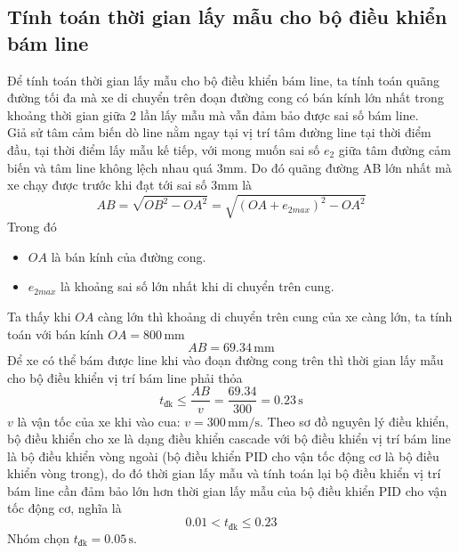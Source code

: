           \subsection{Tính toán thời gian lấy mẫu cho bộ điều khiển bám line}
               \hspace*{0.6cm}Để tính toán thời gian lấy mẫu cho bộ điều khiển bám line, ta tính toán quãng đường tối đa mà xe di chuyển trên đoạn đường cong 
               có bán kính lớn nhất trong khoảng thời gian giữa 2 lần lấy mẫu mà vẫn đảm bảo được sai số bám line.\\
               \hspace*{0.6cm}Giả sử tâm cảm biến dò line nằm ngay tại vị trí tâm đường line tại thời điểm đầu, tại thời điểm lấy mẫu kế tiếp, với mong muốn sai số $e_2$ giữa tâm đường cảm biến 
               và tâm line không lệch nhau quá 3mm. Do đó quãng đường AB lớn nhất mà xe chạy được trước khi đạt tới sai số 3mm là 
               \begin{equation*}
                    AB = \sqrt{OB^2 - OA^2} = \sqrt{(OA + e_{2max})^2 - OA^2}
               \end{equation*}
               Trong đó 
               \begin{itemize}
                    \item $OA$ là bán kính của đường cong.
                    \item $e_{2max}$ là khoảng sai số lớn nhất khi di chuyển trên cung.
               \end{itemize}
               Ta thấy khi $OA$ càng lớn thì khoảng di chuyển trên cung của xe càng lớn, ta tính toán với bán kính $OA = 800 \,\mathrm{mm}$
               \begin{equation*}
                    AB = 69.34 \,\mathrm{mm}
               \end{equation*}
               Để xe có thể bám được line khi vào đoạn đường cong trên thì thời gian lấy mẫu cho bộ điều khiển vị trí bám line phải thỏa 
               \begin{equation*}
                    t_{\text{đk}} \leq \dfrac{AB}{v} = \dfrac{69.34}{300} = 0.23 \,\mathrm{s}
               \end{equation*}
               $v$ là vận tốc của xe khi vào cua: $v = 300 \,\mathrm{mm/s}$. Theo sơ đồ nguyên lý điều khiển, bộ điều khiển cho xe là dạng điều khiển cascade với bộ điều khiển vị trí bám line là bộ điều khiển vòng ngoài (bộ điều khiển PID cho vận tốc động cơ là bộ điều khiển vòng trong), do đó thời gian 
               lấy mẫu và tính toán lại bộ điều khiển vị trí bám line cần đảm bảo lớn hơn thời gian lấy mẫu của bộ điều khiển PID cho vận tốc động cơ, nghĩa là
               \begin{equation*}
                    0.01 < t_{\text{đk}} \leq 0.23
               \end{equation*}
               Nhóm chọn $t_{\text{đk}} = 0.05 \,\mathrm{s}$.
               


